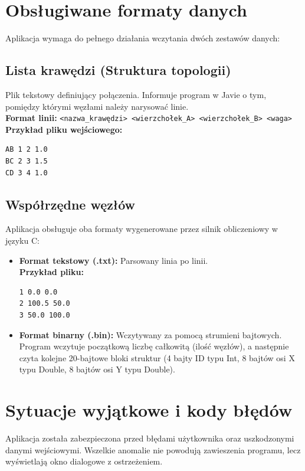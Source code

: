 \documentclass[12pt, a4paper]{article}
\begin{document}
\section{Obsługiwane formaty danych}
Aplikacja wymaga do pełnego działania wczytania dwóch zestawów danych:

\subsection{Lista krawędzi (Struktura topologii)}
Plik tekstowy definiujący połączenia. Informuje program w Javie o tym, pomiędzy którymi węzłami należy narysować linie.
\\
\textbf{Format linii:} \texttt{<nazwa\_krawędzi> <wierzchołek\_A> <wierzchołek\_B> <waga>}
\\
\textbf{Przykład pliku wejściowego:}
\begin{verbatim}
AB 1 2 1.0
BC 2 3 1.5
CD 3 4 1.0
\end{verbatim}

\subsection{Współrzędne węzłów}
Aplikacja obsługuje oba formaty wygenerowane przez silnik obliczeniowy w języku C:
\begin{itemize}
    \item \textbf{Format tekstowy (.txt):} Parsowany linia po linii.
    \\ \textbf{Przykład pliku:}
\begin{verbatim}
1 0.0 0.0
2 100.5 50.0
3 50.0 100.0
\end{verbatim}
    \item \textbf{Format binarny (.bin):} Wczytywany za pomocą strumieni bajtowych. Program wczytuje początkową liczbę całkowitą (ilość węzłów), a następnie czyta kolejne 20-bajtowe bloki struktur (4 bajty ID typu Int, 8 bajtów osi X typu Double, 8 bajtów osi Y typu Double).
\end{itemize}
\section{Sytuacje wyjątkowe i kody błędów}
Aplikacja została zabezpieczona przed błędami użytkownika oraz uszkodzonymi danymi wejściowymi. Wszelkie anomalie nie powodują zawieszenia programu, lecz wyświetlają okno dialogowe z ostrzeżeniem.
\end{document}

